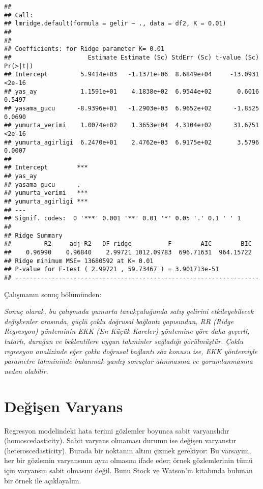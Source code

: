 \documentclass[
]{book}
\begin{document}
\begin{verbatim}
## 
## Call:
## lmridge.default(formula = gelir ~ ., data = df2, K = 0.01)
## 
## 
## Coefficients: for Ridge parameter K= 0.01 
##                     Estimate Estimate (Sc) StdErr (Sc) t-value (Sc) Pr(>|t|)
## Intercept         5.9414e+03   -1.1371e+06  8.6849e+04     -13.0931   <2e-16
## yas_ay            1.1591e+01    4.1838e+02  6.9544e+02       0.6016   0.5497
## yasama_gucu      -8.9396e+01   -1.2903e+03  6.9652e+02      -1.8525   0.0690
## yumurta_verimi    1.0074e+02    1.3653e+04  4.3104e+02      31.6751   <2e-16
## yumurta_agirligi  6.2470e+01    2.4762e+03  6.9175e+02       3.5796   0.0007
##                     
## Intercept        ***
## yas_ay              
## yasama_gucu      .  
## yumurta_verimi   ***
## yumurta_agirligi ***
## ---
## Signif. codes:  0 '***' 0.001 '**' 0.01 '*' 0.05 '.' 0.1 ' ' 1
## 
## Ridge Summary
##         R2     adj-R2   DF ridge          F        AIC        BIC 
##    0.96990    0.96840    2.99721 1012.09783  696.71631  964.15722 
## Ridge minimum MSE= 13680592 at K= 0.01 
## P-value for F-test ( 2.99721 , 59.73467 ) = 3.901713e-51 
## -------------------------------------------------------------------
\end{verbatim}

Çalışmanın sonuç bölümünden:

\emph{Sonuç olarak, bu çalışmada yumurta tavukçuluğunda satış gelirini etkileyebilecek değişkenler arasında, güçlü çoklu doğrusal bağlantı yapısından, RR (Ridge Regresyon) yönteminin EKK (En Küçük Kareler) yöntemine göre daha geçerli, tutarlı, durağan ve beklentilere uygun tahminler sağladığı görülmüştür. Çoklu regresyon analizinde eğer çoklu doğrusal bağlantı söz konusu ise, EKK yöntemiyle parametre tahmininde bulunmak yanlış sonuçlar alınmasına ve yorumlanmasına neden olabilir.}

\hypertarget{deux11fiux15fen-varyans}{%
\chapter{Değişen Varyans}\label{deux11fiux15fen-varyans}}

Regresyon modelindeki hata terimi gözlemler boyunca sabit varyanslıdır (homoscedasticity). Sabit varyans olmaması durumu ise değişen varyanstır (heteroscedasticity). Burada bir noktanın altını çizmek gerekiyor: Bu varsayım, her bir gözlemin varyansının aynı olmasını ifade eder; örnek gözlemlerinin tümü için varyansın sabit olmasını değil. Bunu Stock ve Watson'ın kitabında bulunan bir örnek ile açıklayalım.
\end{document}
